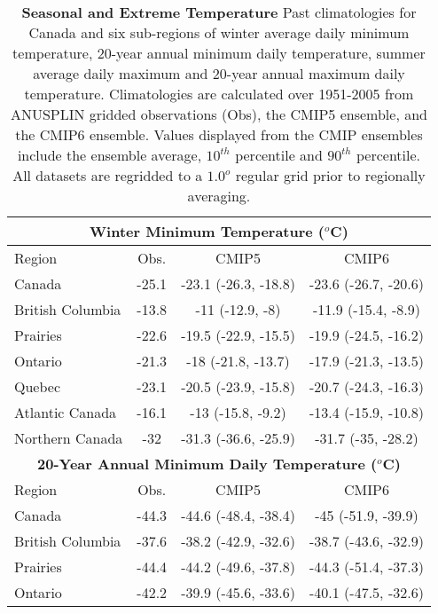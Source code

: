 \documentclass[]{scrartcl}
\begin{document}
\begin{table}[t]
	\caption{\textbf{Seasonal and Extreme Temperature} Past climatologies for Canada and six sub-regions of winter average daily minimum temperature, 20-year annual minimum daily temperature, summer average daily maximum and 20-year annual maximum daily temperature. Climatologies are calculated over 1951-2005 from ANUSPLIN gridded observations (Obs), the CMIP5 ensemble, and the CMIP6 ensemble. Values displayed from the CMIP ensembles include the ensemble average, $10^{th}$ percentile and $90^{th}$ percentile. All datasets are regridded to a $1.0^o$ regular grid prior to regionally averaging.}\label{table:past_tas_compare}
	\begin{center}
		\begin{tabular}{|l|ccc|} 
			\hline
			\multicolumn{4}{|c|}{\textbf{Winter Minimum Temperature ($^o$C)}} \\
			\hline
			Region & Obs. & CMIP5 & CMIP6   \\
			\hline
			Canada & -25.1 & -23.1 (-26.3, -18.8) & -23.6 (-26.7, -20.6) \\ 
			British Columbia & -13.8 & -11 (-12.9, -8) & -11.9 (-15.4, -8.9) \\ 
			Prairies & -22.6 & -19.5 (-22.9, -15.5) & -19.9 (-24.5, -16.2) \\ 
			Ontario & -21.3 & -18 (-21.8, -13.7) & -17.9 (-21.3, -13.5) \\ 
			Quebec & -23.1 & -20.5 (-23.9, -15.8) & -20.7 (-24.3, -16.3) \\ 
			Atlantic Canada & -16.1 & -13 (-15.8, -9.2) & -13.4 (-15.9, -10.8) \\ 
			Northern Canada & -32 & -31.3 (-36.6, -25.9) & -31.7 (-35, -28.2) \\ 
			\hline	
			\multicolumn{4}{|c|}{\textbf{20-Year Annual Minimum Daily Temperature ($^o$C)}} \\
			\hline
			Region & Obs. & CMIP5 & CMIP6   \\
			\hline
			Canada & -44.3 & -44.6 (-48.4, -38.4) & -45 (-51.9, -39.9) \\ 
			British Columbia & -37.6 & -38.2 (-42.9, -32.6) & -38.7 (-43.6, -32.9) \\ 
			Prairies & -44.4 & -44.2 (-49.6, -37.8) & -44.3 (-51.4, -37.3) \\ 
			Ontario & -42.2 & -39.9 (-45.6, -33.6) & -40.1 (-47.5, -32.6) \\ 

\end{tabular}
\end{center}
\end{table}
\end{document}
